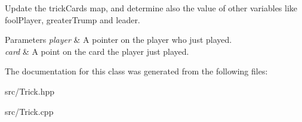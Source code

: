 Update the trick\-Cards map, and determine also the value of other variables like fool\-Player, greater\-Trump and leader. 


\begin{DoxyParams}{Parameters}
{\em player} & A pointer on the player who just played. \\
\hline
{\em card} & A point on the card the player just played. \\
\hline
\end{DoxyParams}


The documentation for this class was generated from the following files\-:\begin{DoxyCompactItemize}
\item 
src/Trick.\-hpp\item 
src/Trick.\-cpp\end{DoxyCompactItemize}

